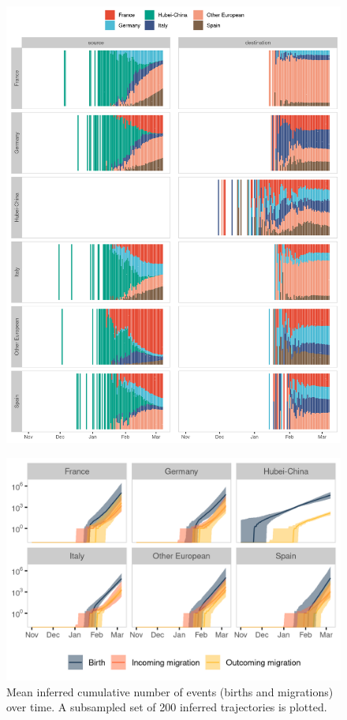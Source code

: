 \documentclass[12pt,]{article}
\begin{document}
\begin{figure}[]
    \centering
    \includegraphics[width=\textwidth]{201030_europe3_figtraj08.png}
    \caption{}
    \label{fig:migs_srcdest}
\end{figure}


\begin{figure}[]
    \centering
    \includegraphics[width=\textwidth]{201030_europe3_figtraj07.png}
    \caption{Mean inferred cumulative number of events (births and migrations) over time. A subsampled set of 200 inferred trajectories is plotted.}
    \label{fig:events}
\end{figure}
\end{document}
